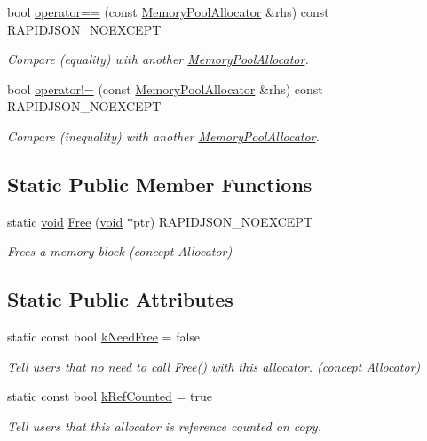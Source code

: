 \begin{DoxyCompactItemize}
bool \hyperlink{classMemoryPoolAllocator_ab2b847d46e865b541c38fb68dfc7d408}{operator==} (const \hyperlink{classMemoryPoolAllocator}{Memory\+Pool\+Allocator} \&rhs) const R\+A\+P\+I\+D\+J\+S\+O\+N\+\_\+\+N\+O\+E\+X\+C\+E\+PT
\begin{DoxyCompactList}\small\item\em Compare (equality) with another \hyperlink{classMemoryPoolAllocator}{Memory\+Pool\+Allocator}. \end{DoxyCompactList}\item 
bool \hyperlink{classMemoryPoolAllocator_ab81d11c88aef06b905cece2e5a4e7b4d}{operator!=} (const \hyperlink{classMemoryPoolAllocator}{Memory\+Pool\+Allocator} \&rhs) const R\+A\+P\+I\+D\+J\+S\+O\+N\+\_\+\+N\+O\+E\+X\+C\+E\+PT
\begin{DoxyCompactList}\small\item\em Compare (inequality) with another \hyperlink{classMemoryPoolAllocator}{Memory\+Pool\+Allocator}. \end{DoxyCompactList}\end{DoxyCompactItemize}
\subsection*{Static Public Member Functions}
\begin{DoxyCompactItemize}
\item 
static \hyperlink{imgui__impl__opengl3__loader_8h_ac668e7cffd9e2e9cfee428b9b2f34fa7}{void} \hyperlink{classMemoryPoolAllocator_ab2ba66e50d09ab315fbfb37f2a231f33}{Free} (\hyperlink{imgui__impl__opengl3__loader_8h_ac668e7cffd9e2e9cfee428b9b2f34fa7}{void} $\ast$ptr) R\+A\+P\+I\+D\+J\+S\+O\+N\+\_\+\+N\+O\+E\+X\+C\+E\+PT
\begin{DoxyCompactList}\small\item\em Frees a memory block (concept Allocator) \end{DoxyCompactList}\end{DoxyCompactItemize}
\subsection*{Static Public Attributes}
\begin{DoxyCompactItemize}
\item 
static const bool \hyperlink{classMemoryPoolAllocator_ab4c7c5c631e451689bc9da392a65194f}{k\+Need\+Free} = false
\begin{DoxyCompactList}\small\item\em Tell users that no need to call \hyperlink{classMemoryPoolAllocator_ab2ba66e50d09ab315fbfb37f2a231f33}{Free()} with this allocator. (concept Allocator) \end{DoxyCompactList}\item 
static const bool \hyperlink{classMemoryPoolAllocator_a3a18920d6afd9e9c9e62d8fd8f73e095}{k\+Ref\+Counted} = true
\begin{DoxyCompactList}\small\item\em Tell users that this allocator is reference counted on copy. \end{DoxyCompactList}\end{DoxyCompactItemize}
